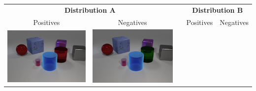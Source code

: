 \begin{table}\centering
{}
\begin{tabular}{@{}ccccc@{}}\toprule
 \multicolumn{2}{c}{\textbf{Distribution A}} &&  \multicolumn{2}{c}{\textbf{Distribution B}} \\ 
 \cmidrule{1-2} \cmidrule{4-5}
Positives& Negatives & \phantom{ab} & Positives & Negatives\\
    \begin{minipage}{.2\textwidth}
      \includegraphics[width=\linewidth]{figures/clevr_datasets/CLEVRA_examples/train1.png}
    \end{minipage}
    &
    \begin{minipage}{.2\textwidth}
      \includegraphics[width=\linewidth]{figures/clevr_datasets/CLEVRA_examples/train_color1.png}
    \end{minipage}
    &&
    \begin{minipage}{.2\textwidth}

\end{minipage}
\end{tabular}
\end{table}
